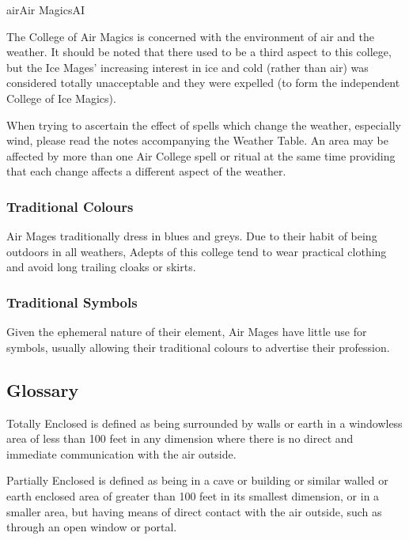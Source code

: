 \begin{college}[2.1]{air}{Air Magics}{AI}

The College of Air Magics is concerned with the environment of air and
the weather. It should be noted that there used to be a third aspect
to this college, but the Ice Mages' increasing interest in ice and
cold (rather than air) was considered totally unacceptable and they
were expelled (to form the independent College of Ice Magics).

When trying to ascertain the effect of spells which change the
weather, especially wind, please read the notes accompanying the
Weather Table. An area may be affected by more than one Air College
spell or ritual at the same time providing that each change affects a
different aspect of the weather.

\subsubsection{Traditional Colours}

Air Mages traditionally dress in blues and greys. Due to their habit
of being outdoors in all weathers, Adepts of this college tend to wear
practical clothing and avoid long trailing cloaks or skirts.

\subsubsection{Traditional Symbols}

Given the ephemeral nature of their element, Air Mages have little use
for symbols, usually allowing their traditional colours to advertise
their profession.

\subsection{Glossary}

\begin{Description}
\item[Totally Enclosed] is defined as being surrounded by walls or
earth in a windowless area of less than 100 feet in any dimension
where there is no direct and immediate communication with the air
outside.

\item[Partially Enclosed] is defined as being in a cave or building
or similar walled or earth enclosed area of greater than 100 feet in
its smallest dimension, or in a smaller area, but having means of
direct contact with the air outside, such as through an open window or
portal.


\end{Description}
\end{college}
